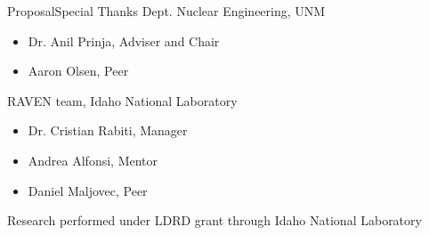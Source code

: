 \documentclass{beamer}
\begin{document}
\begin{frame}{Proposal}{Special Thanks}\vspace{-20pt}
  Dept. Nuclear Engineering, UNM
  \begin{itemize}
    \item Dr. Anil Prinja, Adviser and Chair
    \item Aaron Olsen, Peer
  \end{itemize}
  RAVEN team, Idaho National Laboratory
  \begin{itemize}
    \item Dr. Cristian Rabiti, Manager
    \item Andrea Alfonsi, Mentor
    \item Daniel Maljovec, Peer
  \end{itemize}
  \centering
  Research performed under LDRD grant through Idaho National Laboratory
\end{frame}
\end{document}
